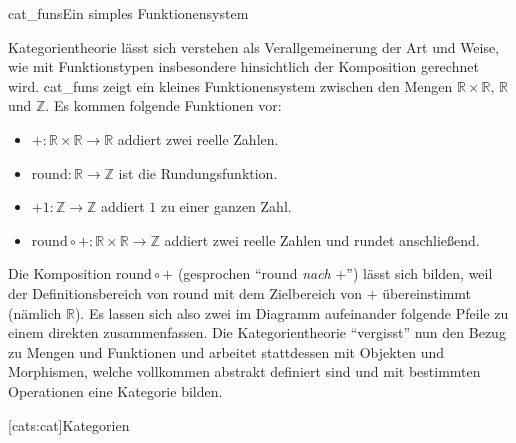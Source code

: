 \documentclass[12pt, a4paper, bibgerm]{scrbook}
\newcommand\lsection{}
\newcommand\abb{}
\newcommand\fig{}
\newcommand\ato{\rightarrow} %
\begin{document}
\fig{cat_funs}{Ein simples Funktionensystem}

Kategorientheorie lässt sich verstehen als Verallgemeinerung der Art und Weise,
wie mit Funktionstypen insbesondere hinsichtlich der Komposition
gerechnet wird. \abb{cat_funs} zeigt ein kleines Funktionensystem zwischen
den Mengen $\mathbb{R} \times \mathbb{R}$, $\mathbb{R}$ und
$\mathbb{Z}$. Es kommen folgende Funktionen vor:
\begin{itemize}
\item $+ : \mathbb{R} \times \mathbb{R} \ato \mathbb{R}$ addiert zwei
  reelle Zahlen.
\item $\mathrm{round} : \mathbb{R} \ato \mathbb{Z}$ ist die
  Rundungsfunktion.
\item $+1 : \mathbb{Z} \ato \mathbb{Z}$ addiert $1$ zu einer ganzen Zahl.
\item $\mathrm{round} \circ + : \mathbb{R} \times \mathbb{R} \ato \mathbb{Z}$
  addiert zwei reelle Zahlen und rundet anschließend.
\end{itemize}

Die Komposition $\mathrm{round} \circ +$ (gesprochen "`round \textit{nach}
+"') lässt sich bilden, weil der Definitionsbereich von $\mathrm{round}$
mit dem Zielbereich von $+$ übereinstimmt (nämlich $\mathbb{R}$). Es
lassen sich also zwei im Diagramm aufeinander folgende Pfeile zu einem
direkten zusammenfassen. Die Kategorientheorie "`vergisst"' nun den
Bezug zu Mengen und Funktionen und arbeitet stattdessen mit Objekten
und Morphismen, welche vollkommen abstrakt definiert sind und mit
bestimmten Operationen eine Kategorie bilden.

\lsection[cats:cat]{Kategorien}
\end{document}
